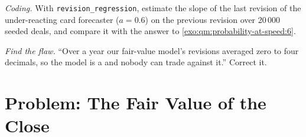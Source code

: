 \begin{exercise}[$\star\star\star$]\label{exo:qm:probability-at-speed:7}
\emph{Coding.} With \texttt{revision\_regression}, estimate the slope of the last revision
of the under-reacting card forecaster ($a = 0.6$) on the previous revision over 20\,000
seeded deals, and compare it with the answer to \cref{exo:qm:probability-at-speed:6}.
\end{exercise}

\begin{exercise}[$\star\star\star$]\label{exo:qm:probability-at-speed:8}
\emph{Find the flaw.} ``Over a year our fair-value model's revisions averaged zero to four
decimals, so the model is a  and nobody can trade against it.'' Correct it.
\end{exercise}

\section{Problem: The Fair Value of the Close}

